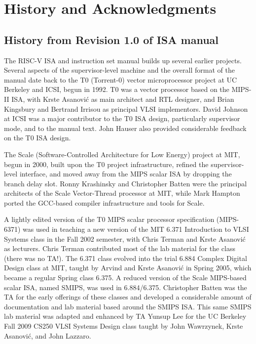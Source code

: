 \newpage
\chapter{History and Acknowledgments}
\label{history}

\section{History from Revision 1.0 of ISA manual}

The RISC-V ISA and instruction set manual builds up several earlier
projects.  Several aspects of the supervisor-level machine and the
overall format of the manual date back to the T0 (Torrent-0) vector
microprocessor project at UC Berkeley and ICSI, begun in 1992.  T0 was
a vector processor based on the MIPS-II ISA, with Krste Asanovi\'{c}
as main architect and RTL designer, and Brian Kingsbury and Bertrand
Irrisou as principal VLSI implementors.  David Johnson at ICSI was a
major contributor to the T0 ISA design, particularly supervisor mode,
and to the manual text.  John Hauser also provided considerable
feedback on the T0 ISA design.

The Scale (Software-Controlled Architecture for Low Energy) project at
MIT, begun in 2000, built upon the T0 project infrastructure, refined
the supervisor-level interface, and moved away from the MIPS scalar
ISA by dropping the branch delay slot.  Ronny Krashinsky and
Christopher Batten were the principal architects of the Scale
Vector-Thread processor at MIT, while Mark Hampton ported the
GCC-based compiler infrastructure and tools for Scale.

A lightly edited version of the T0 MIPS scalar processor specification
(MIPS-6371) was used in teaching a new version of the MIT 6.371
Introduction to VLSI Systems class in the Fall 2002 semester, with
Chris Terman and Krste Asanovi\'{c} as lecturers.  Chris Terman
contributed most of the lab material for the class (there was no
TA!). The 6.371 class evolved into the trial 6.884 Complex Digital
Design class at MIT, taught by Arvind and Krste Asanovi\'{c} in Spring
2005, which became a regular Spring class 6.375.  A reduced version of
the Scale MIPS-based scalar ISA, named SMIPS, was used in 6.884/6.375.
Christopher Batten was the TA for the early offerings of these classes
and developed a considerable amount of documentation and lab material
based around the SMIPS ISA.  This same SMIPS lab material was adapted
and enhanced by TA Yunsup Lee for the UC Berkeley Fall 2009 CS250 VLSI
Systems Design class taught by John Wawrzynek, Krste Asanovi\'{c}, and
John Lazzaro.

